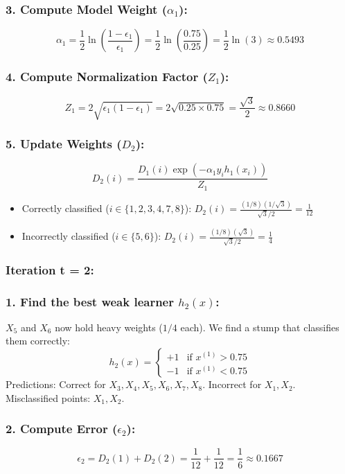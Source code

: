 \documentclass[twoside, 10pt]{article}
\begin{document}
\subsubsection*{3. Compute Model Weight ($\alpha_1$):}
\[
\alpha_1 = \frac{1}{2} \ln \left( \frac{1 - \epsilon_1}{\epsilon_1} \right) = \frac{1}{2} \ln \left( \frac{0.75}{0.25} \right) = \frac{1}{2} \ln(3) \approx 0.5493
\]
\subsubsection*{4. Compute Normalization Factor ($Z_1$):}
\[
Z_1 = 2 \sqrt{\epsilon_1 (1 - \epsilon_1)} = 2 \sqrt{0.25 \times 0.75} = \frac{\sqrt{3}}{2} \approx 0.8660
\]
\subsubsection*{5. Update Weights ($D_2$):}
\[
D_2(i) = \frac{D_1(i) \exp(-\alpha_1 y_i h_1(x_i))}{Z_1}
\]
\begin{itemize}
    \item Correctly classified ($i \in \{1, 2, 3, 4, 7, 8\}$): $D_2(i) = \frac{(1/8) (1/\sqrt{3})}{\sqrt{3}/2} = \frac{1}{12}$
    \item Incorrectly classified ($i \in \{5, 6\}$): $D_2(i) = \frac{(1/8) (\sqrt{3})}{\sqrt{3}/2} = \frac{1}{4}$
\end{itemize}
\subsubsection{Iteration t = 2:}
\subsubsection*{1. Find the best weak learner $h_2(x)$:}
$X_5$ and $X_6$ now hold heavy weights ($1/4$ each). We find a stump that classifies them correctly:
\[
h_2(x) = \begin{cases} 
+1 & \text{if } x^{(1)} > 0.75 \\ 
-1 & \text{if } x^{(1)} < 0.75 
\end{cases}
\]
Predictions: Correct for $X_3, X_4, X_5, X_6, X_7, X_8$. Incorrect for $X_1, X_2$. \\
Misclassified points: $X_1, X_2$.
\subsubsection*{2. Compute Error ($\epsilon_2$):}
\[
\epsilon_2 = D_2(1) + D_2(2) = \frac{1}{12} + \frac{1}{12} = \frac{1}{6} \approx 0.1667
\]
\end{document}
